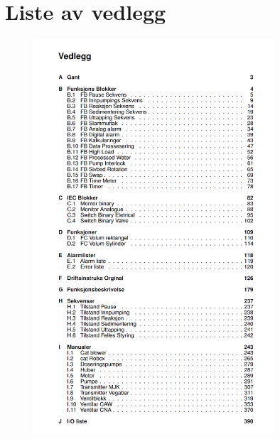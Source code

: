 
\chapter*{Liste av vedlegg}
\thispagestyle{fancy}

\begin{figure}[H]
    \centering
    \includegraphics[width=0.8\textwidth]{Appendix/ListeAvVedlegg.png}
    \caption*{} %
    \label{fig:VedlegListe}
\end{figure}
